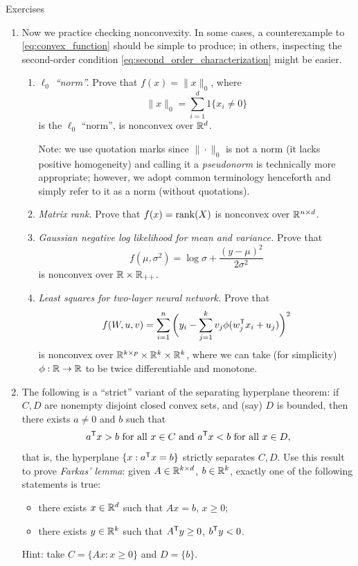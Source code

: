 \begin{xcb}{Exercises}
\begin{enumerate}[label=\thechapter.\arabic*]
\item Now we practice checking nonconvexity. In some cases, a counterexample to
  \eqref{eq:convex_function} should be simple to produce; in others, inspecting
  the second-order condition \eqref{eq:second_order_characterization} might be
  easier.  

\begin{enumerate}[label=\alph*.]
\item \emph{$\ell_0$ ``norm''.}  Prove that $f(x) = \|x\|_0$, where
  \begin{equation}
  \label{eq:l0_norm}
  \|x\|_0 = \sum_{i=1}^d 1\{x_i \not= 0\}
  \end{equation}
  is the $\ell_0$ ``norm'', is nonconvex over $\mathbb{R}^d$.

  \smallskip
  Note: we use quotation marks since $\|\cdot\|_0$ is not a norm (it lacks
  positive homogeneity) and calling it a \emph{pseudonorm} is technically more
  appropriate; however, we adopt common terminology henceforth and simply
  refer to it as a norm (without quotations).    

\item \emph{Matrix rank.} Prove that $f(x) = \operatorname{rank}(X)$ is nonconvex over $\mathbb{R}^{n
    \times d}$.   

\item \emph{Gaussian negative log likelihood for mean and variance.} Prove that  
  \[
  f(\mu, \sigma^2) = \log \sigma + \frac{(y - \mu)^2}{2\sigma^2}
  \]
  is nonconvex over $\mathbb{R} \times \mathbb{R}_{++}$.

\item \emph{Least squares for two-layer neural network.} Prove that 
  \[
  f(W, u, v) = \sum_{i=1}^n \bigg( y_i - \sum_{j=1}^k v_j 
  \phi (w_j^{\mathsf{T}} x_i + u_j) \bigg)^2 
  \]
  is nonconvex over $\mathbb{R}^{k \times p} \times \mathbb{R}^k \times \mathbb{R}^k$, where we can take
  (for simplicity) $\phi : \mathbb{R} \to \mathbb{R}$ to be twice differentiable and monotone.    
\end{enumerate}

\item \label{ex:farkas_lemma} 
  The following is a ``strict'' variant of the separating hyperplane theorem: if 
  $C,D$ are nonempty disjoint closed convex sets, and (say) $D$ is bounded, 
  then there exists $a \not=0 $ and $b$ such that 
  \[
  \text{$a^{\mathsf{T}} x > b$ for all $x \in C$ and $a^{\mathsf{T}} x < b$ for all $x \in D$},
  \]  
  that is, the hyperplane $\{x: a^{\mathsf{T}} x =  b\}$ strictly separates $C,D$. 
  Use this result to prove \emph{Farkas' lemma}: given $A \in \mathbb{R}^{k \times d}$,
  $b \in \mathbb{R}^k$, exactly one of the following statements is true: 
  \begin{itemize}
  \item there exists $x \in \mathbb{R}^d$ such that $Ax=b$, $x \geq 0$;
  \item there exists $y \in \mathbb{R}^k$ such that $A^{\mathsf{T}} y \geq 0$, $b^{\mathsf{T}} y < 0$. 
  \end{itemize}
  Hint: take $C = \{Ax : x \geq 0\}$ and $D = \{b\}$. 


\end{enumerate}
\end{xcb}
